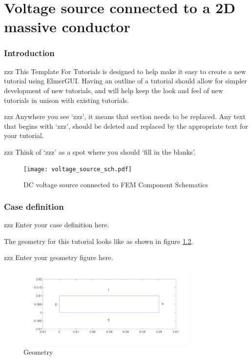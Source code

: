 \chapter{Voltage source connected to a 2D massive conductor }



\subsection*{Introduction}

zzz This Template For Tutorials is designed to help make it easy to create a new tutorial using ElmerGUI.  Having an outline of a tutorial should allow for simpler development of new tutorials, and will help keep the look and feel of new tutorials in unison with existing tutorials.

zzz Anywhere you see `zzz', it means that section needs to be replaced.  Any text that begins with `zzz', should be deleted and replaced by the appropriate text for your tutorial.  

zzz Think of `zzz' as a spot where you should `fill in the blanks'.

\begin{figure}[H]
\centering
\texttt{[image: voltage\_source\_sch.pdf]}
\caption{DC voltage source connected to FEM Component Schematics}\label{fg:dc_voltage_source}
\end{figure}  

\subsection*{Case definition}


zzz Enter your case definition here.

The geometry for this tutorial looks like as shown in figure \ref{fg:geometry}.

zzz Enter your geometry figure here.

\begin{figure}[H]
\centering
\includegraphics[width=0.8\textwidth]{geometry.png}
\caption{Geometry}\label{fg:geometry}
\end{figure}  

